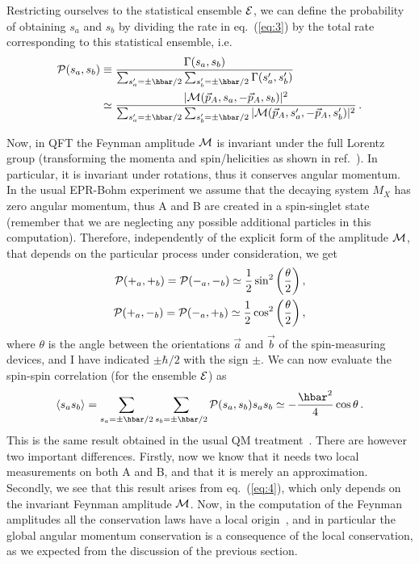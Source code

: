 \documentclass[12pt]{article}
\begin{document}
Restricting ourselves to the statistical ensemble ${\cal E}$, we can
define the probability of obtaining $s_a$ and $s_b$ by dividing the
rate in eq.~(\ref{eq:3}) by the total rate corresponding to this
statistical ensemble, i.e.\ 
\begin{equation}
\begin{split} 
{\cal P}(s_a,s_b) &\equiv \frac{\Gamma(s_a,s_b)}{
\sum_{s'_a=\pm\hbar/2}\sum_{s'_b=\pm\hbar/2}\Gamma(s'_a,s'_b)}\\
&\simeq\frac{\vert {\cal M} (\vec p_A,s_a,-\vec p_A,s_b)\vert^2}
{\sum_{s'_a=\pm\hbar/2}\sum_{s'_b=\pm\hbar/2}\vert {\cal M} (\vec
p_A,s'_a,-\vec p_A,s'_b)\vert^2}\,. \label{eq:4}
\end{split}
\end{equation}

Now, in QFT the Feynman amplitude ${\cal M}$ is invariant under the
full Lorentz group (transforming the momenta and spin/helicities as
shown in ref.~\cite{WeinbookI}). In particular, it is invariant under
rotations, thus it conserves angular momentum. In the usual EPR-Bohm
experiment we assume that the decaying system $M_X$ has zero angular
momentum, thus A and B are created in a spin-singlet state (remember
that we are neglecting any possible additional particles in this
computation).  Therefore, independently of the explicit form of the
amplitude ${\cal M}$, that depends on the particular process under
consideration, we get
\begin{equation}
\begin{split}
{\cal P}(+_a,+_b)={\cal
P}(-_a,-_b)\simeq\frac12\sin^2\left(\frac\theta2\right), \\
{\cal P}(+_a,-_b)={\cal P}(-_a,+_b)\simeq\frac12
\cos^2\left(\frac\theta2\right),
\label{eq:5}
\end{split}
\end{equation}
where $\theta$ is the angle between the orientations $\vec a$ and
$\vec b$ of the spin-measuring devices, and I have indicated
$\pm\hbar/2$ with the sign $\pm$. We can now evaluate the
spin-spin correlation (for the ensemble ${\cal E}$) as
\begin{equation}
\langle s_a s_b \rangle =
\sum_{s_a=\pm\hbar/2}\sum_{s_b=\pm\hbar/2}{\cal P}(s_a,s_b) s_a
s_b \simeq -\frac{\hbar^2}{4}\cos\theta\,. \label{eq:6}
\end{equation}
This is the same result obtained in the usual QM
treatment~\cite{BJ,Laloe}. There are however two important
differences.  Firstly, now we know that it needs two local
measurements on both A and B, and that it is merely an
approximation. Secondly, we see that this result arises from
eq.~(\ref{eq:4}), which only depends on the invariant Feynman
amplitude ${\cal M}$. Now, in the computation of the Feynman
amplitudes all the conservation laws have a local
origin~\cite{WeinbookI,WeinbookII}, and in particular the global
angular momentum conservation is a consequence of the local
conservation, as we expected from the discussion of the previous
section.
\end{document}
